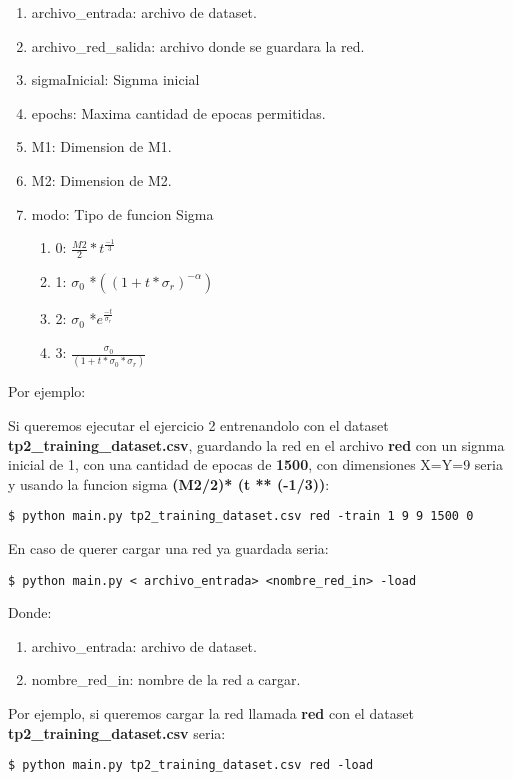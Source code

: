 \begin{enumerate}
\item archivo\_entrada: archivo de dataset.
\item archivo\_red\_salida: archivo donde se guardara la red.
\item sigmaInicial: Signma inicial
\item epochs: Maxima cantidad de epocas permitidas.
\item M1: Dimension de M1.
\item M2: Dimension de M2.
\item modo: Tipo de funcion Sigma
\begin{enumerate}
\item 0: $\frac{M2}{2}* t^\frac{-1}{3}$
\item 1: $\sigma_0$ *$((1+t*\sigma_r)^{-\alpha})$
\item 2: $\sigma_0$ *$e^\frac{-t}{\sigma_r}$
\item 3: $\frac{\sigma_0}{(1+t*\sigma_0*\sigma_r)}$ 
\end{enumerate}
\end{enumerate}

Por ejemplo: 

Si queremos ejecutar el ejercicio 2 entrenandolo con el dataset \textbf{tp2\_training\_dataset.csv}, guardando la red en el archivo \textbf{red} con un signma inicial de 1, con una cantidad de epocas de \textbf{1500}, con dimensiones X=Y=9 seria y usando la funcion sigma \textbf{(M2/2)* (t ** (-1/3))}:

\begin{verbatim}
$ python main.py tp2_training_dataset.csv red -train 1 9 9 1500 0
\end{verbatim}

En caso de querer cargar una red ya guardada seria:

\begin{verbatim}
$ python main.py < archivo_entrada> <nombre_red_in> -load 
\end{verbatim}

Donde:

\begin{enumerate}
\item archivo\_entrada: archivo de dataset.
\item nombre\_red\_in: nombre de la red a cargar.
\end{enumerate}

Por ejemplo, si queremos cargar la red llamada \textbf{red} con el dataset \textbf{tp2\_training\_dataset.csv} seria:

\begin{verbatim}
$ python main.py tp2_training_dataset.csv red -load
\end{verbatim}

